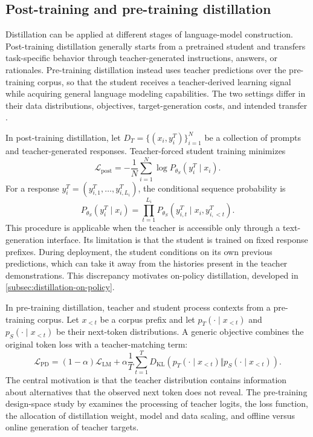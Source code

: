 \subsection{Post-training and pre-training distillation}
\label{subsec:distillation-training-stages}

Distillation can be applied at different stages of language-model
construction.  Post-training distillation generally starts from a pretrained
student and transfers task-specific behavior through teacher-generated
instructions, answers, or rationales.  Pre-training distillation instead
uses teacher predictions over the pre-training corpus, so that the student
receives a teacher-derived learning signal while acquiring general language
modeling capabilities.  The two settings differ in their data distributions,
objectives, target-generation costs, and intended transfer
\parencite{Peng2024PretrainingDistillation,Yang2024SurveyKD}.

In post-training distillation, let
\(D_T=\{(x_i,y_i^T)\}_{i=1}^{N}\) be a collection of prompts and
teacher-generated responses.  Teacher-forced student training minimizes
\begin{equation}
    \mathcal L_{\mathrm{post}}
    =-\frac{1}{N}\sum_{i=1}^{N}
    \log P_{\theta_S}(y_i^T\mid x_i).
    \label{eq:distillation-posttraining-loss}
\end{equation}
For a response \(y_i^T=(y_{i,1}^T,\ldots,y_{i,L_i}^T)\), the
conditional sequence probability is
\begin{equation}
    P_{\theta_S}(y_i^T\mid x_i)
    =\prod_{t=1}^{L_i}
    P_{\theta_S}(y_{i,t}^T\mid x_i,y_{i,<t}^T).
    \label{eq:distillation-response-factorization}
\end{equation}
This procedure is applicable when the teacher is accessible only through a
text-generation interface.  Its limitation is that the student is trained on
fixed response prefixes.  During deployment, the student conditions on its
own previous predictions, which can take it away from the histories present
in the teacher demonstrations.  This discrepancy motivates on-policy
distillation, developed in \cref{subsec:distillation-on-policy}.

In pre-training distillation, teacher and student process contexts from a
pre-training corpus.  Let \(x_{<t}\) be a corpus prefix and let
\(p_T(\cdot\mid x_{<t})\) and \(p_S(\cdot\mid x_{<t})\) be their
next-token distributions.  A generic objective combines the original token
loss with a teacher-matching term:
\begin{equation}
    \mathcal L_{\mathrm{PD}}
    =(1-\alpha)\mathcal L_{\mathrm{LM}}
    +\alpha\frac{1}{T}\sum_{t=1}^{T}
    D_{\mathrm{KL}}\left(
       p_T(\cdot\mid x_{<t})
       \Vert p_S(\cdot\mid x_{<t})
    \right).
    \label{eq:distillation-pretraining-objective}
\end{equation}
The central motivation is that the teacher distribution contains information
about alternatives that the observed next token does not reveal.  The
pre-training design-space study by \textcite{Peng2024PretrainingDistillation}
examines the processing of teacher logits, the loss function, the allocation
of distillation weight, model and data scaling, and offline versus online
generation of teacher targets.


